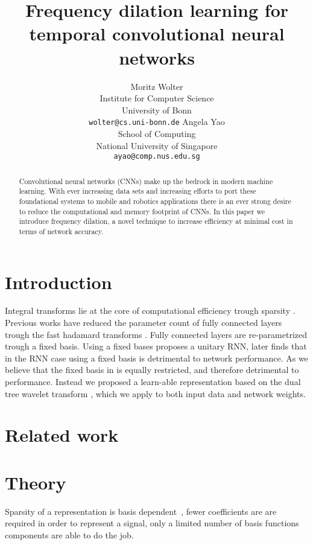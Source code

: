 \documentclass{article}
\title{Frequency dilation learning for temporal convolutional neural networks}
\author{Moritz Wolter\\
 Institute for Computer Science\\
 University of Bonn\\
 {\tt\small wolter@cs.uni-bonn.de}
 \And
 Angela Yao\\
 School of Computing\\
 National University of Singapore\\
 {\tt\small ayao@comp.nus.edu.sg}
}
\begin{document}
\maketitle

\begin{abstract}
Convolutional neural networks (CNNs) make up the bedrock in modern machine learning. With ever increasing data sets and increasing efforts to port these foundational systems to mobile and robotics applications there is an ever strong desire to reduce the computational and memory footprint of CNNs. In this paper we introduce frequency dilation, a novel technique to increase efficiency at minimal cost in terms of network accuracy.
\end{abstract}

\section{Introduction}
Integral transforms lie at the core of computational efficiency trough sparsity \cite{Mallat}\cite{TruongNguyenGilbertStrang}. Previous works have reduced the parameter count of fully connected layers trough the fast hadamard transforms \cite{yang2015deep}. Fully connected layers are re-parametrized trough a fixed basis. Using a fixed bases \cite{Arjovsky2016} proposes a unitary RNN, later \cite{Wisdom2016} finds that in the RNN case using a fixed basis is detrimental to network performance. 
As we believe that the fixed basis in \cite{yang2015deep} is equally restricted, and therefore detrimental to performance. Instead we proposed a learn-able representation based on the dual tree wavelet transform \cite{Selesnick}, which we apply to both input data and network weights. 

\section{Related work}
\cite{Recoskie2018}

\section{Theory}
Sparsity of a representation is basis dependent~\cite{TruongNguyenGilbertStrang}\cite{Strang1994}, fewer coefficients are are required in order to represent a signal, only a limited number of basis functions components are able to do the job.

\newpage
{\small


}
\end{document}
